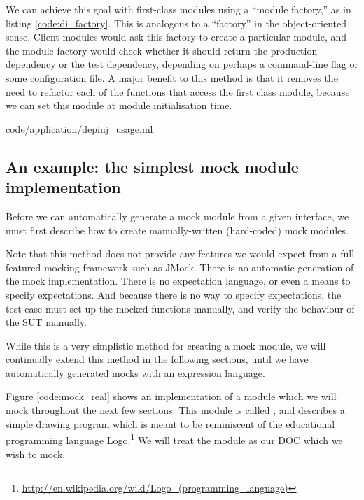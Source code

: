 We can achieve this goal with first-class modules using a ``module
factory,'' as in listing \ref{code:di_factory}. This is analogous to a
``factory'' in the object-oriented sense. Client modules would ask
this factory to create a particular module, and the module factory
would check whether it should return the production dependency or the
test dependency, depending on perhaps a command-line flag or some
configuration file. A major benefit to this method is that it removes
the need to refactor each of the functions that access the first class
module, because we can set this module at module initialisation time.

 {code/application/depinj_usage.ml}


\subsection{An example: the simplest mock module implementation}
\label{application:simple}

Before we can automatically generate a mock module from a given
interface, we must first describe how to create manually-written
(hard-coded) mock modules.

Note that this method does not provide any features we would expect
from a full-featured mocking framework such as JMock. There is no
automatic generation of the mock implementation. There is no
expectation language, or even a means to specify expectations. And
because there is no way to specify expectations, the test case must
set up the mocked functions manually, and verify the behaviour of the
SUT manually.

While this is a very simplistic method for creating a mock module, we
will continually extend this method in the following sections, until
we have automatically generated mocks with an expression
language.


Figure \ref{code:mock_real} shows an implementation of a module which
we will mock throughout the next few sections. This module is called
, and describes a simple drawing program which is meant
to be reminiscent of the educational programming language
Logo.\footnote{\url{http://en.wikipedia.org/wiki/Logo_(programming_language)}}
We will treat the  module as our DOC which we wish to
mock.

